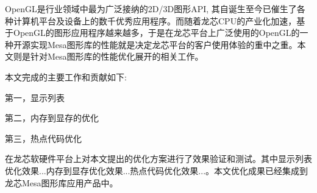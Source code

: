 

\makeatletter

\makeatother








\begin{cabstract}

  OpenGL是行业领域中最为广泛接纳的2D/3D图形API, 其自诞生至今已催生了各种计算机平台及设备上的数千优秀应用程序。而随着龙芯CPU的产业化加速，基于OpenGL的图形应用程序越来越多，于是在龙芯平台上广泛使用的OpenGL的一种开源实现Mesa图形库的性能就是决定龙芯平台的客户使用体验的重中之重。本文则是针对Mesa图形库的性能优化展开的相关工作。

  本文完成的主要工作和贡献如下:

  第一，显示列表

  第二，内存到显存的优化

  第三，热点代码优化

  在龙芯软硬件平台上对本文提出的优化方案进行了效果验证和测试。其中显示列表优化效果...内存到显存优化效果...热点代码优化效果...。本文优化成果已经集成到龙芯Mesa图形库应用产品中。

\end{cabstract}


